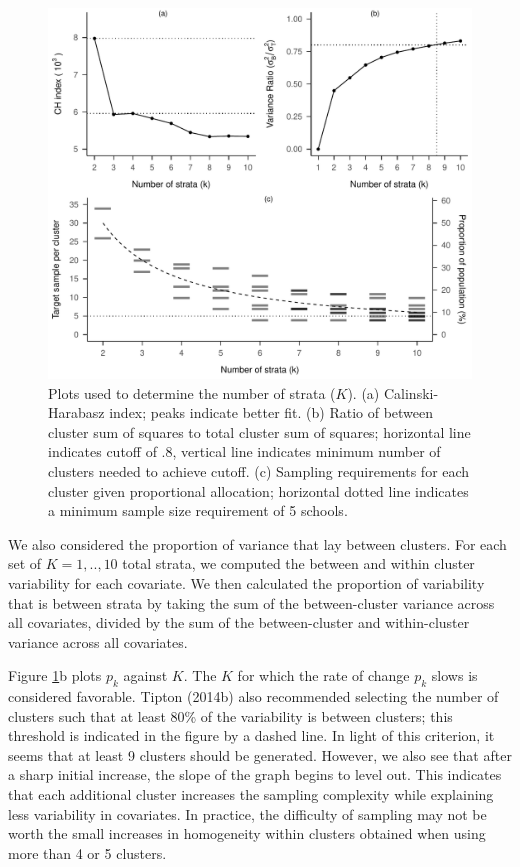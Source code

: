 \documentclass[
  english,
  man,floatsintext]{apa6}
\begin{document}
\begin{figure}[tbp]
\includegraphics[width=1\linewidth]{6---Paper_files/figure-latex/fig-k-plots-1} \caption{Plots used to determine the number of strata (\(K\)). (a) Calinski-Harabasz index; peaks indicate better fit. (b) Ratio of between cluster sum of squares to total cluster sum of squares; horizontal line indicates cutoff of .8, vertical line indicates minimum number of clusters needed to achieve cutoff. (c) Sampling requirements for each cluster given proportional allocation; horizontal dotted line indicates a minimum sample size requirement of 5 schools. }\label{fig:fig-k-plots}
\end{figure}

We also considered the proportion of variance that lay between clusters. For each set of \(K = 1,..,10\) total strata, we computed the between and within cluster variability for each covariate. We then calculated the proportion of variability that is between strata by taking the sum of the between-cluster variance across all covariates, divided by the sum of the between-cluster and within-cluster variance across all covariates.

Figure \ref{fig:fig-k-plots}b plots \(p_k\) against \(K\). The \(K\) for which the rate of change \(p_k\) slows is considered favorable. Tipton (2014b) also recommended selecting the number of clusters such that at least 80\% of the variability is between clusters; this threshold is indicated in the figure by a dashed line. In light of this criterion, it seems that at least 9 clusters should be generated. However, we also see that after a sharp initial increase, the slope of the graph begins to level out. This indicates that each additional cluster increases the sampling complexity while explaining less variability in covariates. In practice, the difficulty of sampling may not be worth the small increases in homogeneity within clusters obtained when using more than 4 or 5 clusters.
\end{document}
